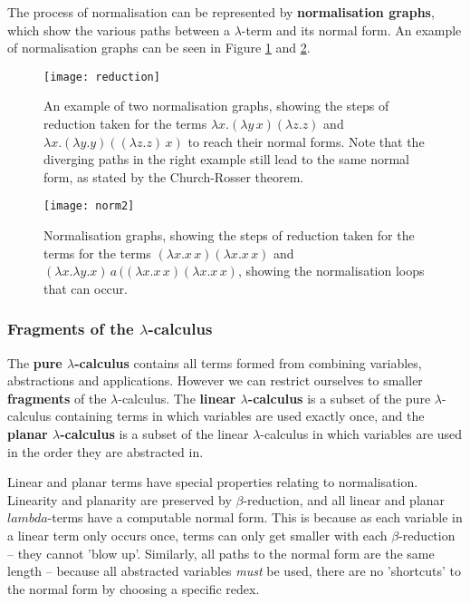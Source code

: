 \documentclass[11pt]{article}
\begin{document}
The process of normalisation can be represented by \textbf{normalisation graphs}, which show the various paths between a $\lambda$-term and its normal form. An example of normalisation graphs can be seen in Figure \ref{fig:normgraphs} and \ref{fig:normgraphs2}.

\begin{figure}
    \centering
    \texttt{[image: reduction]}
    \caption{An example of two normalisation graphs, showing the steps of reduction taken for the terms $\lambda x. (\lambda y \, x) (\lambda z. z)$ and $\lambda x. (\lambda y. y) ((\lambda z. z) \, x)$ to reach their normal forms. Note that the diverging paths in the right example still lead to the same normal form, as stated by the Church-Rosser theorem.}
    \label{fig:normgraphs}
\end{figure}

\begin{figure}
    \centering
    \texttt{[image: norm2]}
    \caption{Normalisation graphs, showing the steps of reduction taken for the terms for the terms $(\lambda x. x \, x)(\lambda x. x \, x)$ and $(\lambda x. \lambda y. x) \, a \, ((\lambda x. x \, x)(\lambda x. x \, x)$, showing the normalisation loops that can occur.}
    \label{fig:normgraphs2}
\end{figure}

\subsubsection{Fragments of the \texorpdfstring{$\lambda$}{lambda}-calculus}
The \textbf{pure $\lambda$-calculus} contains all terms formed from combining variables, abstractions and applications. However we can restrict ourselves to smaller \textbf{fragments} of the $\lambda$-calculus. The \textbf{linear $\lambda$-calculus} is a subset of the pure $\lambda$-calculus containing terms in which variables are used exactly once, and the \textbf{planar $\lambda$-calculus} is a subset of the linear $\lambda$-calculus in which variables are used in the order they are abstracted in. 

Linear and planar terms have special properties relating to normalisation. Linearity and planarity are preserved by $\beta$-reduction, and all linear and planar $lambda$-terms have a computable normal form. This is because as each variable in a linear term only occurs once, terms can only get smaller with each $\beta$-reduction -- they cannot 'blow up'. Similarly, all paths to the normal form are the same length -- because all abstracted variables \textit{must} be used, there are no 'shortcuts' to the normal form by choosing a specific redex. 
\end{document}
